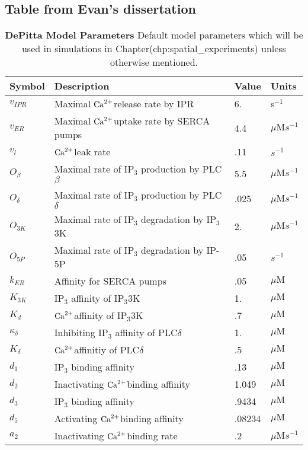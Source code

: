 \documentclass[11pt]{article}
\newcommand{\ca}{$\rm{Ca}^{2+}$}
\begin{document}
\subsection{Table from Evan's dissertation}
\begin{table}
\centering
\begin{tabular}{ |l|l|l|l| }
\hline
Symbol & Description & Value & Units       \\
\hline
  $v_{IPR}$         & Maximal \ca release rate by IPR   &   6. & s$^{-1}$    \\
  $v_{ER}$         & Maximal \ca uptake rate by SERCA pumps  &   4.4 &  $\mu\mathrm{M}s^{-1}$    \\
  $v_l$         & \ca leak rate  &   .11   & $s^{-1}$ \\
  $O_\beta$         & Maximal rate of IP$_3$ production by PLC$\beta$  &   5.5  &   $\mu\mathrm{M}s^{-1}$  \\ \hline
  $O_\delta$    & Maximal rate of IP$_3$ production by PLC$\delta$  &   .025   &   $\mu\mathrm{M}s^{-1}$\\
  $O_{3K}$    & Maximal rate of IP$_3$ degradation by IP$_3$3K  &   2.   &  $\mu\mathrm{M}s^{-1}$ \\
  $O_{5P}$         & Maximal rate of IP$_3$ degradation by IP-5P  &   .05  & $s^{-1}$   \\
  $k_{ER}$      &  Affinity for SERCA pumps &   .05   &   $\mu\mathrm{M}$  \\
  $K_{3K}$      & IP$_3$ affinity of IP$_3$3K  &   1.&     $\mu\mathrm{M}$  \\
  $K_d$      & \ca affinity of IP$_3$3K   &   .7     &   $\mu\mathrm{M}$ \\
  $\kappa_\delta$      & Inhibiting IP$_3$ affinity of PLC$\delta$  &   1. &   $\mu\mathrm{M}$   \\
  $K_\delta$      & \ca affinitiy of PLC$\delta$  &   .5 &  $\mu\mathrm{M}$    \\
  $d_1$      & IP$_3$ binding affinity   &   .13     &$\mu\mathrm{M}$  \\
  $d_2$      & Inactivating \ca binding affinity  &   1.049  &  $\mu\mathrm{M}$   \\
  $d_3$      & IP$_3$ binding affinity  &   .9434    &  $\mu\mathrm{M}$  \\
  $d_5$      & Activating \ca binding affinity  &   .08234    & $\mu\mathrm{M}$  \\
  $a_2$      & Inactivating \ca binding rate  &   .2     & $\mu\mathrm{M}s^{-1}$  \\
  \hline
\end{tabular}
\caption{\textbf{DePitta Model Parameters} Default model parameters which will be used in simulations in Chapter(chp:spatial\_experiments) unless otherwise mentioned.}
\end{table}
\end{document}
